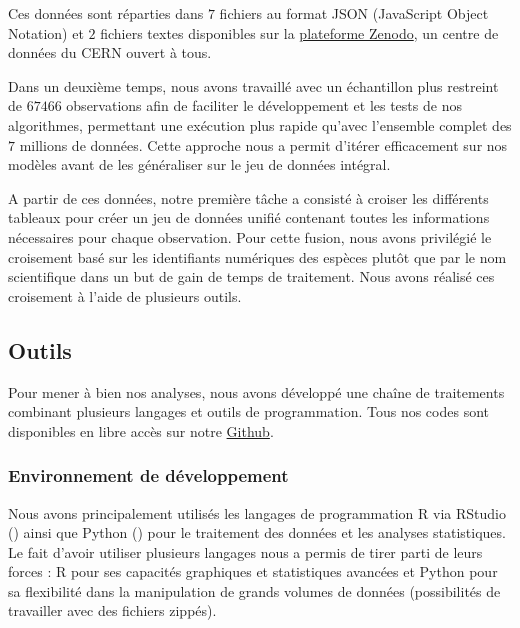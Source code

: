 \documentclass[a4paper,12pt]{article}
\begin{document}
\vspace{0.2cm}

Ces données sont réparties dans $7$ fichiers au format JSON (JavaScript Object Notation) et $2$ fichiers textes disponibles sur la \href{https://zenodo.org/records/10782465}{plateforme Zenodo}, un centre de données du CERN ouvert à tous.

\vspace{0.2cm}

Dans un deuxième temps, nous avons travaillé avec un échantillon plus restreint de $\num{67 466}$ observations afin de faciliter le développement et les tests de nos algorithmes, permettant une exécution plus rapide qu'avec l'ensemble complet des $7$ millions de données. Cette approche nous a permit d'itérer efficacement sur nos modèles avant de les généraliser sur le jeu de données intégral.

\vspace{0.2cm}

A partir de ces données, notre première tâche a consisté à croiser les différents tableaux pour créer un jeu de données unifié contenant toutes les informations nécessaires pour chaque observation. Pour cette fusion, nous avons privilégié le croisement basé sur les identifiants numériques des espèces plutôt que par le nom scientifique dans un but de gain de temps de traitement. Nous avons réalisé ces croisement à l'aide de plusieurs outils.


\subsection{Outils}

Pour mener à bien nos analyses, nous avons développé une chaîne de traitements combinant plusieurs langages et outils de programmation. Tous nos codes sont disponibles en libre accès sur notre \href{https://github.com/lcletz/PLANTNET_M1_SSD}{Github}.

\subsubsection{Environnement de développement}

Nous avons principalement utilisés les langages de programmation R via RStudio (\cite{RStudio}) ainsi que Python (\cite{Python}) pour le traitement des données et les analyses statistiques. Le fait d'avoir utiliser plusieurs langages nous a permis de tirer parti de leurs forces : R pour ses capacités graphiques et statistiques avancées et Python pour sa flexibilité dans la manipulation de grands volumes de données (possibilités de travailler avec des fichiers zippés).
\end{document}
